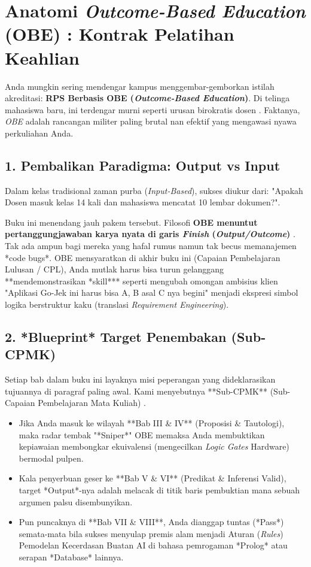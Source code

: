 \section{Anatomi \textit{Outcome-Based Education} (OBE) : Kontrak Pelatihan Keahlian}

Anda mungkin sering mendengar kampus menggembar-gemborkan istilah akreditasi: \textbf{RPS Berbasis OBE (\textit{Outcome-Based Education})}. Di telinga mahasiswa baru, ini terdengar murni seperti urusan birokratis dosen \cite{spady1994,obe_springer2024}. Faktanya, \textit{OBE} adalah rancangan militer paling brutal nan efektif yang mengawasi nyawa perkuliahan Anda.

\subsection{1. Pembalikan Paradigma: Output vs Input}

Dalam kelas tradisional zaman purba (\textit{Input-Based}), sukses diukur dari: "Apakah Dosen masuk kelas 14 kali dan mahasiswa mencatat 10 lembar dokumen?". 

Buku ini menendang jauh pakem tersebut. Filosofi \textbf{OBE menuntut pertanggungjawaban karya nyata di garis \textit{Finish} (\textit{Output/Outcome})} \cite{spady1994}. Tak ada ampun bagi mereka yang hafal rumus namun tak becus memanajemen *code bugs*. OBE mensyaratkan di akhir buku ini (Capaian Pembelajaran Lulusan / CPL), Anda mutlak harus bisa turun gelanggang **mendemonstrasikan *skill*** seperti mengubah omongan ambisius klien "Aplikasi Go-Jek ini harus bisa A, B asal C nya begini" menjadi ekspresi simbol logika berstruktur kaku (translasi \textit{Requirement Engineering}).

\subsection{2. *Blueprint* Target Penembakan (Sub-CPMK)}

Setiap bab dalam buku ini layaknya misi peperangan yang dideklarasikan tujuannya di paragraf paling awal. Kami menyebutnya **Sub-CPMK** (Sub-Capaian Pembelajaran Mata Kuliah) \cite{in4obe}. 

\begin{itemize}
  \item Jika Anda masuk ke wilayah **Bab III \& IV** (Proposisi \& Tautologi), maka radar tembak "*Sniper*" OBE memaksa Anda membuktikan kepiawaian membongkar ekuivalensi (mengecilkan \textit{Logic Gates} Hardware) bermodal pulpen.
  \item Kala penyerbuan geser ke **Bab V \& VI** (Predikat \& Inferensi Valid), target *Output*-nya adalah melacak di titik baris pembuktian mana sebuah argumen palsu disembunyikan.
  \item Pun puncaknya di **Bab VII \& VIII**, Anda dianggap tuntas (*Pass*) semata-mata bila sukses menyulap premis alam menjadi Aturan (\textit{Rules}) Pemodelan Kecerdasan Buatan AI di bahasa pemrogaman *Prolog* atau serapan *Database* lainnya.
\end{itemize}

